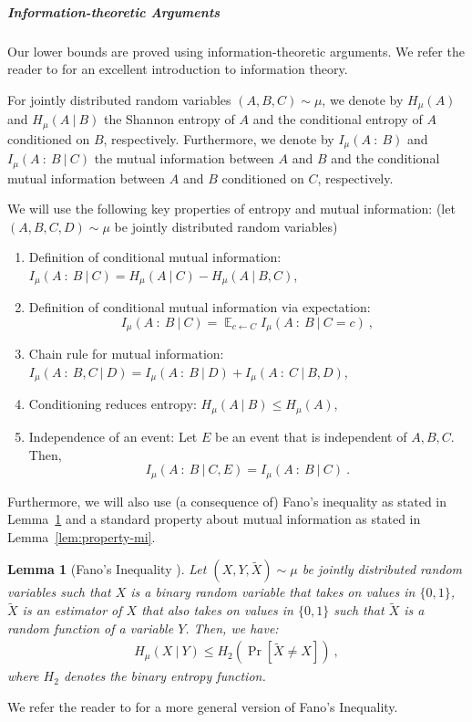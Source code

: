 \documentclass[11pt,a4paper]{article}
\newtheorem{lemma}{Lemma}
\DeclareMathOperator{\Exp}{\mathbb{E}}
\begin{document}
\subparagraph{Information-theoretic Arguments} Our lower bounds are proved using information-theoretic arguments. We refer the reader to \cite{ct06} for an excellent introduction to information theory.

For jointly distributed random variables $(A,B,C) \sim \mu$, we denote by $H_{\mu}(A)$ and $H_{\mu}(A \ | \ B)$ the Shannon entropy of $A$ and the conditional entropy of $A$ conditioned on $B$, respectively. Furthermore, we denote by $I_{\mu}(A \ : \ B)$ and $I_{\mu}(A \ : \ B \ | \ C)$ the mutual information between $A$ and $B$ and the conditional mutual information between $A$ and $B$ conditioned on $C$, respectively. 

We will use the following key properties of entropy and mutual information: (let $(A,B,C,D) \sim \mu$ be jointly distributed random variables)

\begin{enumerate} 
 \item Definition of conditional mutual information: $I_{\mu}(A \ : \ B \ | \ C) = H_{\mu}(A \ | \ C) - H_{\mu}(A \ | \ B,C)$,

 \item Definition of conditional mutual information via expectation: $$\displaystyle I_{\mu}(A \ : \ B \ | \ C) = \Exp_{c \gets C} I_{\mu}(A \ : \ B \ | \ C = c) \ ,$$

 \item Chain rule for mutual information: $I_{\mu}(A \ : \ B,C \ | \ D) = I_{\mu}(A \ : \ B \ | \ D) + I_{\mu}(A \ : \ C \ | \ B,D)$,


 \item Conditioning reduces entropy: $H_{\mu}(A \ | \ B) \le H_{\mu}(A)$,

 \item Independence of an event: Let $E$ be an event that is independent of $A,B,C$. Then,  $$I_{\mu}(A \ : \ B \ | \ C, E) = I_{\mu}(A \ : \ B \ | \ C) \ . $$
\end{enumerate}

Furthermore, we will also use (a consequence of) Fano's inequality as stated in Lemma~\ref{lem:fano} and a standard property about mutual information as stated in Lemma~\ref{lem:property-mi}.
\begin{lemma}[Fano's Inequality \cite{ct06}]\label{lem:fano}
Let $(X,Y, \tilde{X}) \sim \mu$ be jointly distributed random variables such that $X$ is a binary random variable that takes on values in $\{0,1\}$, $\tilde{X}$  is an estimator of $X$ that also takes on values in $\{0, 1\}$ such that $\tilde{X}$ is a random function of a variable $Y$. Then, we have:
 \begin{align*}
     H_{\mu}(X \ | \ Y) \le H_2(\Pr[\tilde{X} \neq X]) \ , 
 \end{align*}
 where $H_2$ denotes the binary entropy function.
\end{lemma}
We refer the reader to \cite{ct06} for a more general version of Fano's Inequality.
\end{document}
